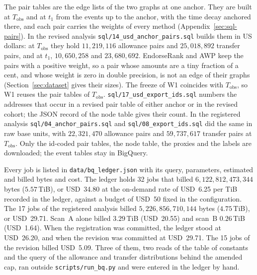 The pair tables are the edge lists of the two graphs at one anchor. They are built at $T_{\text{obs}}$ and at $t_1$ from the events up to the anchor, with the time decay anchored there, and each pair carries the weights of every method (Appendix~\ref{sec:sql-pairs}). In the revised analysis \texttt{sql/14\_usd\_anchor\_pairs.sql} builds them in US dollars: at $T_{\text{obs}}$ they hold $11{,}219{,}116$ allowance pairs and $25{,}018{,}892$ transfer pairs, and at $t_1$, $10{,}650{,}258$ and $23{,}680{,}692$. EndorseRank and AWP keep the pairs with a positive weight, so a pair whose amounts are a tiny fraction of a cent, and whose weight is zero in double precision, is not an edge of their graphs (Section~\ref{sec:dataset} gives their sizes). The freeze of W1 coincides with $T_{\text{obs}}$, so W1 reuses the pair tables of $T_{\text{obs}}$. \texttt{sql/17\_usd\_export\_ids.sql} numbers the addresses that occur in a revised pair table of either anchor or in the revised cohort; the JSON record of the node table gives their count. In the registered analysis \texttt{sql/04\_anchor\_pairs.sql} and \texttt{sql/08\_export\_ids.sql} did the same in raw base units, with $22{,}321{,}470$ allowance pairs and $59{,}737{,}617$ transfer pairs at $T_{\text{obs}}$. Only the id-coded pair tables, the node table, the proxies and the labels are downloaded; the event tables stay in BigQuery.

Every job is listed in \texttt{data/bq\_ledger.json} with its query, parameters, estimated and billed bytes and cost. The ledger holds 32 jobs that billed $6{,}122{,}812{,}473{,}344$ bytes ($5.57$\,TiB), or USD~34.80 at the on-demand rate of USD~6.25 per TiB recorded in the ledger, against a budget of USD~50 fixed in the configuration. The 17 jobs of the registered analysis billed $5{,}226{,}856{,}710{,}144$ bytes ($4.75$\,TiB), or USD~29.71. Scan~A alone billed $3.29$\,TiB (USD~20.55) and scan~B $0.26$\,TiB (USD~1.64). When the registration was committed, the ledger stood at USD~26.20, and when the revision was committed at USD~29.71. The 15 jobs of the revision billed USD~5.09. Three of them, two reads of the table of constants and the query of the allowance and transfer distributions behind the amended cap, ran outside \texttt{scripts/run\_bq.py} and were entered in the ledger by hand.



